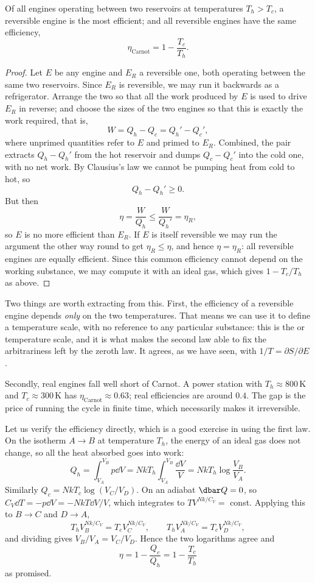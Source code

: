 \begin{theorem}
	Of all engines operating between two reservoirs at temperatures $T_h > T_c$, a reversible engine is the most efficient; and all reversible engines have the same efficiency,
	$$
	\eta_{\mathrm{Carnot}} = 1 - \frac{T_c}{T_h}.
	$$
\end{theorem}
\begin{proof}
	Let $E$ be any engine and $E_R$ a reversible one, both operating between the same two reservoirs. Since $E_R$ is reversible, we may run it backwards as a refrigerator. Arrange the two so that all the work produced by $E$ is used to drive $E_R$ in reverse; and choose the sizes of the two engines so that this is exactly the work required, that is,
	$$
	W = Q_h - Q_c = Q_h' - Q_c',
	$$
	where unprimed quantities refer to $E$ and primed to $E_R$. Combined, the pair extracts $Q_h - Q_h'$ from the hot reservoir and dumps $Q_c - Q_c'$ into the cold one, with no net work. By Clausius's law we cannot be pumping heat from cold to hot, so
	$$
	Q_h - Q_h' \geq 0.
	$$
	But then
	$$
	\eta = \frac{W}{Q_h} \leq \frac{W}{Q_h'} = \eta_R,
	$$
	so $E$ is no more efficient than $E_R$. If $E$ is itself reversible we may run the argument the other way round to get $\eta_R \leq \eta$, and hence $\eta = \eta_R$: all reversible engines are equally efficient. Since this common efficiency cannot depend on the working substance, we may compute it with an ideal gas, which gives $1 - T_c/T_h$ as above.
\end{proof}

Two things are worth extracting from this. First, the efficiency of a reversible engine depends \emph{only} on the two temperatures. That means we can use it to define a temperature scale, with no reference to any particular substance: this is the  or  temperature scale, and it is what makes the second law able to fix the arbitrariness left by the zeroth law. It agrees, as we have seen, with $1/T = \partial S/\partial E$.

Secondly, real engines fall well short of Carnot. A power station with $T_h \approx 800\,\mathrm{K}$ and $T_c \approx 300\,\mathrm{K}$ has $\eta_{\mathrm{Carnot}} \approx 0.63$; real efficiencies are around $0.4$. The gap is the price of running the cycle in finite time, which necessarily makes it irreversible.

\begin{example}
	Let us verify the efficiency directly, which is a good exercise in using the first law. On the isotherm $A\to B$ at temperature $T_h$, the energy of an ideal gas does not change, so all the heat absorbed goes into work:
	$$
	Q_h = \int_{V_A}^{V_B}p\dd V = NkT_h\int_{V_A}^{V_B}\frac{\dd V}{V} = NkT_h\log\frac{V_B}{V_A}.
	$$
	Similarly $Q_c = NkT_c\log(V_C/V_D)$. On an adiabat $\dbar Q = 0$, so $C_V \dd T = -p\dd V = -NkT\dd V/V$, which integrates to $TV^{Nk/C_V} = $ const. Applying this to $B \to C$ and $D \to A$,
	$$
	T_h V_B^{Nk/C_V} = T_c V_C^{Nk/C_V}, \qquad T_h V_A^{Nk/C_V} = T_c V_D^{Nk/C_V},
	$$
	and dividing gives $V_B/V_A = V_C/V_D$. Hence the two logarithms agree and
	$$
	\eta = 1 - \frac{Q_c}{Q_h} = 1 - \frac{T_c}{T_h}
	$$
	as promised.
\end{example}

